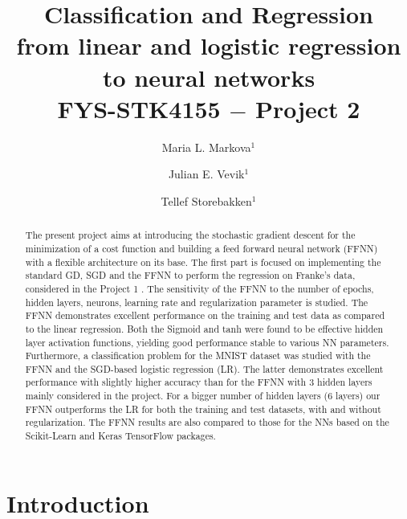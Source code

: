 \documentclass{emulateapj}
\begin{document}
\title{Classification and Regression\\
from linear and logistic regression to neural networks\\
FYS-STK4155 $-$ Project 2}

\author{Maria L. Markova$^1$}

\author{Julian E. Vevik$^1$}

\author{Tellef Storebakken$^1$}





\begin{abstract}

The present project aims at introducing the stochastic gradient descent for the minimization of a cost function and building a feed forward neural network (FFNN) with a flexible architecture on its base. The first part is focused on implementing the standard GD, SGD and the FFNN to perform the regression on Franke's data, considered in the Project 1 \cite{proj1,proj1_2}. The sensitivity of the FFNN to the number of epochs, hidden layers, neurons, learning rate and regularization parameter is studied. The FFNN demonstrates excellent performance on the training and test data as compared to the linear regression. Both the Sigmoid and tanh were found to be effective hidden layer activation functions, yielding good performance stable to various NN parameters. Furthermore, a classification problem for the MNIST dataset was studied with the FFNN and the SGD-based logistic regression (LR). The latter demonstrates excellent performance with slightly higher  accuracy than for the FFNN with 3 hidden layers mainly considered in the project. For a bigger number of hidden layers (6 layers) our FFNN outperforms the LR for both the training and test datasets, with and without regularization. The FFNN results are also compared to those for the NNs based on the Scikit-Learn and Keras TensorFlow packages.

\end{abstract}


\section{Introduction}
\label{sec: introduction}
\end{document}
